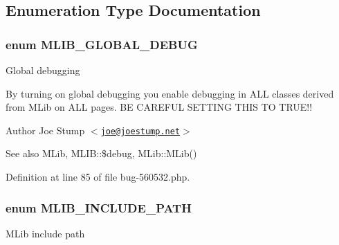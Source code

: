 \subsection{\-Enumeration \-Type \-Documentation}
\hypertarget{bug-560532_8php_a06805e0feca1483374f6e4ff790428de}{
\subsubsection[{\-M\-L\-I\-B\-\_\-\-G\-L\-O\-B\-A\-L\-\_\-\-D\-E\-B\-U\-G}]{\setlength{\rightskip}{0pt plus 5cm}enum {\bf \-M\-L\-I\-B\-\_\-\-G\-L\-O\-B\-A\-L\-\_\-\-D\-E\-B\-U\-G}}}\label{bug-560532_8php_a06805e0feca1483374f6e4ff790428de}
\-Global debugging

\-By turning on global debugging you enable debugging in \-A\-L\-L classes derived from \-M\-Lib on \-A\-L\-L pages. \-B\-E \-C\-A\-R\-E\-F\-U\-L \-S\-E\-T\-T\-I\-N\-G \-T\-H\-I\-S \-T\-O \-T\-R\-U\-E!!

\begin{DoxyAuthor}{\-Author}
\-Joe \-Stump $<$\href{mailto:joe@joestump.net}{\tt joe@joestump.\-net}$>$ 
\end{DoxyAuthor}
\begin{DoxySeeAlso}{\-See also}
\-M\-Lib, \-M\-L\-I\-B\-::\$debug, \-M\-Lib\-::\-M\-Lib() 
\end{DoxySeeAlso}


\-Definition at line 85 of file bug-\/560532.\-php.

\hypertarget{bug-560532_8php_a1a2325154c8188acb8b9570d7b4d45de}{
\subsubsection[{\-M\-L\-I\-B\-\_\-\-I\-N\-C\-L\-U\-D\-E\-\_\-\-P\-A\-T\-H}]{\setlength{\rightskip}{0pt plus 5cm}enum {\bf \-M\-L\-I\-B\-\_\-\-I\-N\-C\-L\-U\-D\-E\-\_\-\-P\-A\-T\-H}}}\label{bug-560532_8php_a1a2325154c8188acb8b9570d7b4d45de}
\-M\-Lib include path

